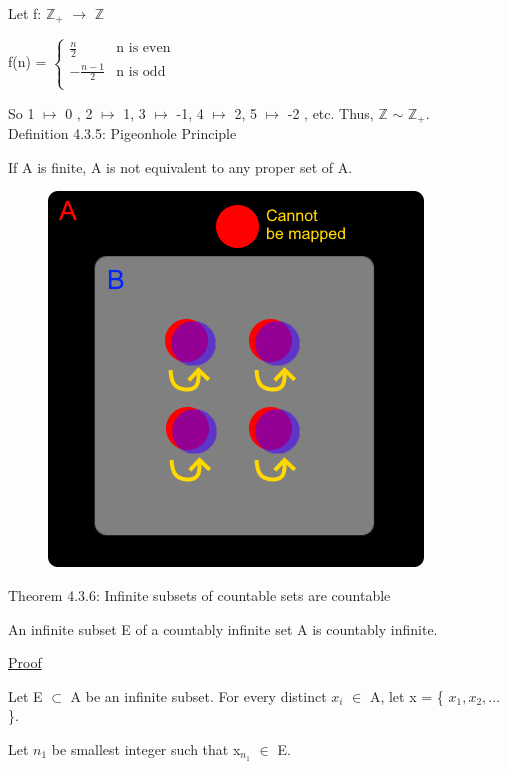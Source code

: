 	Let f: $\mathbb{Z}_+$ $\rightarrow$ $\mathbb{Z}$

	\hspace{0.5cm} f(n) = 
	$
	\begin{cases}
		\frac{n}{2} & \text{n is even} \\
		-\frac{n-1}{2} & \text{n is odd} \\
	\end{cases}
	$

	So 1 $\mapsto$ 0 , 2 $\mapsto$ 1, 3 $\mapsto$ -1, 4 $\mapsto$ 2, 5 $\mapsto$ -2 , etc.
	Thus, $\mathbb{Z}$ $\sim$ $\mathbb{Z}_+$. \\ 

{ \color{blue} Definition 4.3.5: Pigeonhole Principle } 

	\qquad If A is finite, A is not equivalent to any proper set of A.

	\begin{figure}[h]
	\centering
	\includegraphics[scale=0.5]{Images/4.3.5.png}
\end{figure}

{ \color{red} Theorem 4.3.6: Infinite subsets of countable sets are countable } 

	\qquad An infinite subset E of a countably infinite set A is countably infinite.

{ \color{magenta} \underline{Proof} } 

	Let E $\subset$ A be an infinite subset.
	For every distinct $x_i$ $\in$ A, let x = \{ $x_1, x_2, ...$ \}.

	Let $n_1$ be smallest integer such that x$_{n_1}$ $\in$ E.

